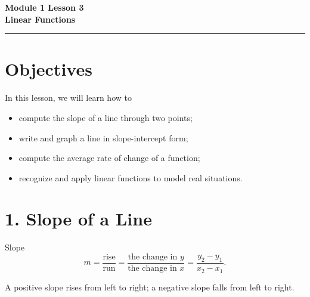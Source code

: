\documentclass[12pt]{article}
\begin{document}
\handwriting

\begin{center}
    \Large\textbf{\color{primaryblue}Module 1 Lesson 3\\Linear Functions} \\
    \vspace{0.2cm}
    \hrule
\end{center}

\section*{Objectives}

\begin{friendlyrule}{In this lesson, we will learn how to}
\begin{itemize}
    \item compute the slope of a line through two points;
    \item write and graph a line in slope-intercept form;
    \item compute the average rate of change of a function;
    \item recognize and apply linear functions to model real situations.
\end{itemize}
\end{friendlyrule}

\section*{1. Slope of a Line}

\begin{friendlyrule}{Slope}
\[
m=\frac{\text{rise}}{\text{run}}=\frac{\text{the change in }y}{\text{the change in }x}=\frac{y_2-y_1}{x_2-x_1}.
\]
\end{friendlyrule}

A positive slope rises from left to right; a negative slope falls from left to right.

\begin{center}
\end{center}
\end{document}
